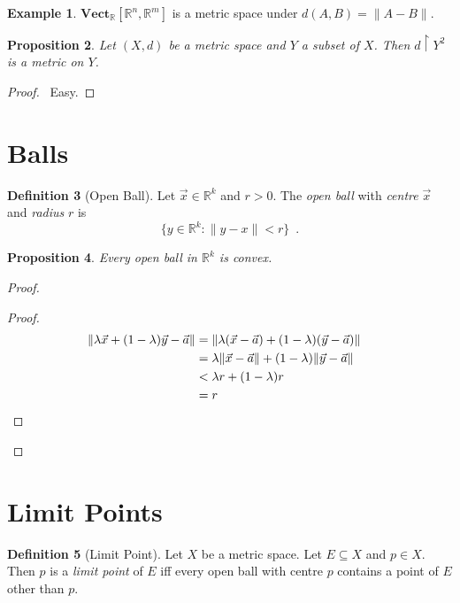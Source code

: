 \documentclass{book}
\let\qed\relax
\newtheorem{prop}{Proposition}[chapter]
\theoremstyle{definition}
\newtheorem{df}[prop]{Definition}
\newtheorem{ex}[prop]{Example}
\begin{document}
\begin{ex}
$\mathbf{Vect}_\mathbb{R}[\mathbb{R}^n, \mathbb{R}^m]$ is a metric space under $d(A,B) = \| A - B \|$.
\end{ex}

\begin{prop}
Let $(X,d)$ be a metric space and $Y$ a subset of $X$. Then $d \restriction Y^2$ is a metric on $Y$.
\end{prop}

\begin{proof}
\pf\ Easy. \qed
\end{proof}

\section{Balls}

\begin{df}[Open Ball]
Let $\vec{x} \in \mathbb{R}^k$ and $r > 0$. The \emph{open ball} with \emph{centre} $\vec{x}$ and \emph{radius} $r$ is
\[ \{ y \in \mathbb{R}^k : \| y - x \| < r \} \enspace . \]
\end{df}

\begin{prop}
Every open ball in $\mathbb{R}^k$ is convex.
\end{prop}

\begin{proof}
\pf
{}
\begin{proof}
\pf
\begin{align*}
\| \lambda \vec{x} + (1 - \lambda) \vec{y} - \vec{a} \|
& = \| \lambda (\vec{x} - \vec{a}) + (1 - \lambda) (\vec{y} - \vec{a}) \| \\
& = \lambda \| \vec{x} - \vec{a} \| + (1 - \lambda) \| \vec{y} - \vec{a} \| \\
& < \lambda r + (1 - \lambda) r \\
& = r & \qed
\end{align*}
\end{proof}
\qed
\end{proof}

\section{Limit Points}

\begin{df}[Limit Point]
Let $X$ be a metric space. Let $E \subseteq X$ and $p \in X$. Then $p$ is a \emph{limit point} of $E$ iff every open ball with centre $p$ contains a point of $E$ other than $p$.
\end{df}
\end{document}

